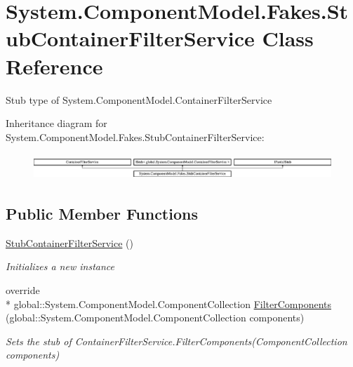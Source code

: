 \hypertarget{class_system_1_1_component_model_1_1_fakes_1_1_stub_container_filter_service}{\section{System.\-Component\-Model.\-Fakes.\-Stub\-Container\-Filter\-Service Class Reference}
\label{class_system_1_1_component_model_1_1_fakes_1_1_stub_container_filter_service}
}


Stub type of System.\-Component\-Model.\-Container\-Filter\-Service 


Inheritance diagram for System.\-Component\-Model.\-Fakes.\-Stub\-Container\-Filter\-Service\-:\begin{figure}[H]
\begin{center}
\leavevmode
\includegraphics[height=0.972222cm]{class_system_1_1_component_model_1_1_fakes_1_1_stub_container_filter_service}
\end{center}
\end{figure}
\subsection*{Public Member Functions}
\begin{DoxyCompactItemize}
\item 
\hyperlink{class_system_1_1_component_model_1_1_fakes_1_1_stub_container_filter_service_acc5989a8f47e235f6bf030608faf314a}{Stub\-Container\-Filter\-Service} ()
\begin{DoxyCompactList}\small\item\em Initializes a new instance\end{DoxyCompactList}\item 
override \\*
global\-::\-System.\-Component\-Model.\-Component\-Collection \hyperlink{class_system_1_1_component_model_1_1_fakes_1_1_stub_container_filter_service_a37d63425ce31816715412057af36f8ab}{Filter\-Components} (global\-::\-System.\-Component\-Model.\-Component\-Collection components)
\begin{DoxyCompactList}\small\item\em Sets the stub of Container\-Filter\-Service.\-Filter\-Components(\-Component\-Collection components)\end{DoxyCompactList}\end{DoxyCompactItemize}
